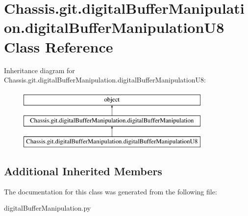 \hypertarget{class_chassis_8git_1_1digital_buffer_manipulation_1_1digital_buffer_manipulation_u8}{\section{Chassis.\-git.\-digital\-Buffer\-Manipulation.\-digital\-Buffer\-Manipulation\-U8 Class Reference}
\label{class_chassis_8git_1_1digital_buffer_manipulation_1_1digital_buffer_manipulation_u8}
}
Inheritance diagram for Chassis.\-git.\-digital\-Buffer\-Manipulation.\-digital\-Buffer\-Manipulation\-U8\-:\begin{figure}[H]
\begin{center}
\leavevmode
\includegraphics[height=3.000000cm]{class_chassis_8git_1_1digital_buffer_manipulation_1_1digital_buffer_manipulation_u8}
\end{center}
\end{figure}
\subsection*{Additional Inherited Members}


The documentation for this class was generated from the following file\-:\begin{DoxyCompactItemize}
\item 
digital\-Buffer\-Manipulation.\-py\end{DoxyCompactItemize}
